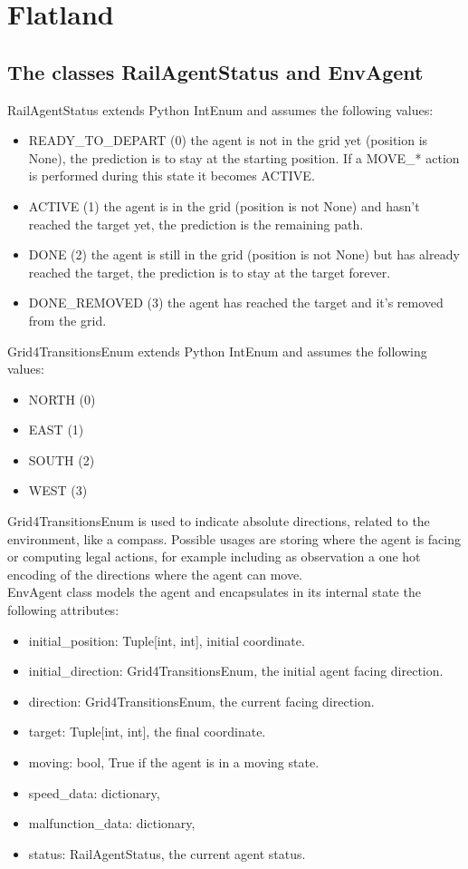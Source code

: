 \documentclass[12pt, a4paper, hidelinks]{article}
\begin{document}
\section{Flatland}

\subsection{The classes RailAgentStatus and EnvAgent}

RailAgentStatus extends Python IntEnum and assumes the following values:
\begin{itemize}
	\item READY\_TO\_DEPART (0) the agent is not in the grid yet (position is None), the prediction is to stay at the starting position. If a MOVE\_* action is performed during this state it becomes ACTIVE\@.
	\item ACTIVE (1) the agent is in the grid (position is not None) and hasn't reached the target yet, the prediction is the remaining path.
	\item DONE (2) the agent is still in the grid (position is not None) but has already reached the target, the prediction is to stay at the target forever.
	\item DONE\_REMOVED (3) the agent has reached the target and it's removed from the grid.
\end{itemize}

Grid4TransitionsEnum extends Python IntEnum and assumes the following values:
\begin{itemize}
	\item NORTH (0)
	\item EAST (1)
	\item SOUTH (2)
	\item WEST (3)
\end{itemize}
Grid4TransitionsEnum is used to indicate absolute directions, related to the environment, like a compass.
Possible usages are storing where the agent is facing or computing legal actions, for example including as observation a one hot encoding of the directions where the agent can move.
\\
EnvAgent class models the agent and encapsulates in its internal state the following attributes:
\begin{itemize}
	\item initial\_position: Tuple[int, int], initial coordinate.
	\item initial\_direction: Grid4TransitionsEnum, the initial agent facing direction.
	\item direction: Grid4TransitionsEnum, the current facing direction.
	\item target: Tuple[int, int], the final coordinate.
	\item moving: bool, True if the agent is in a moving state.
	\item speed\_data: dictionary,
	\item malfunction\_data: dictionary,
	\item status: RailAgentStatus, the current agent status.
\end{itemize}
\end{document}
